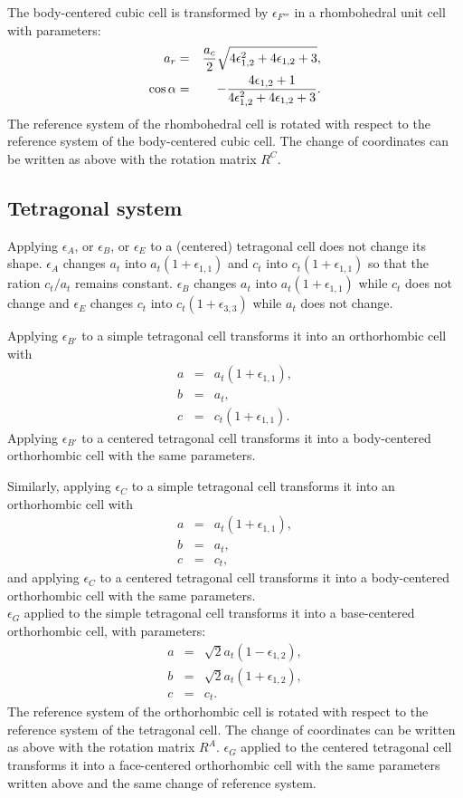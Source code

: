 \documentclass[12pt,a4paper]{article}
\begin{document}
The body-centered cubic cell is transformed by 
$\epsilon_{F'''}$ in a rhombohedral unit cell
with parameters:
\begin{eqnarray}
a_r&=& {a_c \over 2} \sqrt{ 4\epsilon_{1,2}^2 + 4\epsilon_{1,2} + 3 }, \\
\cos\alpha &=& -{4\epsilon_{1,2}+1 \over 4\epsilon_{1,2}^2+4\epsilon_{1,2}+3}.
\end{eqnarray}
The reference system of the rhombohedral cell is rotated with respect to
the reference system of the body-centered cubic cell. 
The change of coordinates can be written as above with the rotation matrix 
$R^C$.

\subsection{\color{web-blue}Tetragonal system}
Applying $\epsilon_A$, or $\epsilon_B$, or $\epsilon_E$ to a 
(centered) tetragonal cell
does not change its shape. $\epsilon_A$ changes $a_t$ into 
$a_t(1+\epsilon_{1,1})$ and $c_t$ into $c_t(1+\epsilon_{1,1})$ so that the
ration $c_t/a_t$ remains constant. 
$\epsilon_B$ changes $a_t$ into $a_t(1+\epsilon_{1,1})$
while $c_t$ does not change and $\epsilon_E$ changes  
$c_t$ into $c_t(1+\epsilon_{3,3})$ while $a_t$ does not change.

Applying $\epsilon_{B'}$ to a simple tetragonal cell transforms it into an  
orthorhombic cell with
\begin{eqnarray}
a&=& a_t (1+\epsilon_{1,1}), \\
b&=& a_t, \\
c&=& c_t (1+\epsilon_{1,1}).
\end{eqnarray}
Applying $\epsilon_{B'}$ to a centered tetragonal cell transforms it
into a body-centered orthorhombic cell with the same
parameters. 

Similarly, applying $\epsilon_C$ to a simple tetragonal cell transforms 
it into an  orthorhombic cell with
\begin{eqnarray}
a&=&a_t (1+\epsilon_{1,1}), \\
b&=&a_t, \\
c&=&c_t,
\end{eqnarray}
and applying $\epsilon_C$ to a centered tetragonal cell transforms it
into a body-centered orthorhombic cell with the same
parameters.\\

$\epsilon_G$ applied to the simple tetragonal cell transforms it into a 
base-centered orthorhombic cell, with parameters:
\begin{eqnarray}
a&=&\sqrt{2} a_t (1-\epsilon_{1,2}), \\
b&=&\sqrt{2} a_t (1+\epsilon_{1,2}) , \\
c&=&c_t.
\end{eqnarray}
The reference system of the orthorhombic cell is rotated with respect to
the reference system of the tetragonal cell. 
The change of coordinates can be written as above with the rotation matrix 
$R^A$.
$\epsilon_G$ applied to the centered tetragonal cell transforms it into
a face-centered orthorhombic cell with the same parameters written above
and the same change of reference system.
\end{document}
